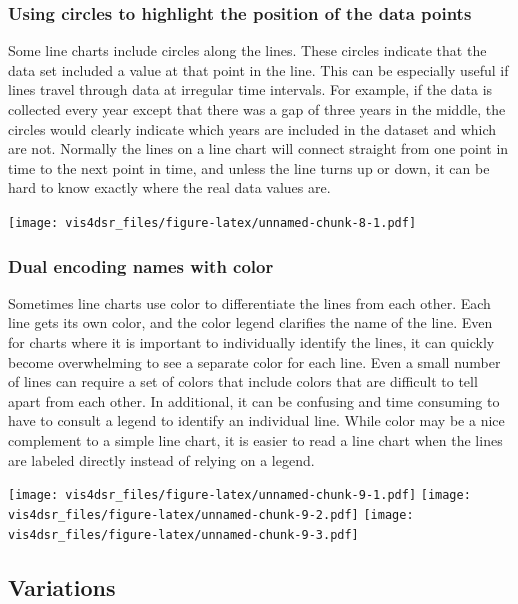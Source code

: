 \documentclass[
]{krantz}
\begin{document}
\hypertarget{using-circles-to-highlight-the-position-of-the-data-points}{%
\subsubsection{Using circles to highlight the position of the data points}\label{using-circles-to-highlight-the-position-of-the-data-points}}

Some line charts include circles along the lines. These circles indicate that the
data set included a value at that point in the line. This can be especially useful
if lines travel through data at irregular time intervals. For example, if the data
is collected every year except that there was a gap of three years in the middle,
the circles would clearly indicate which years are included in the dataset and which
are not. Normally the lines on a line chart will connect straight from one point in
time to the next point in time, and unless the line turns up or down, it can be
hard to know exactly where the real data values are.

\texttt{[image: vis4dsr\_files/figure-latex/unnamed-chunk-8-1.pdf]}

\hypertarget{dual-encoding-names-with-color}{%
\subsubsection{Dual encoding names with color}\label{dual-encoding-names-with-color}}

Sometimes line charts use color to differentiate the lines from each other. Each line
gets its own color, and the color legend clarifies the name of the line. Even for
charts where it is important to individually identify the lines, it can quickly
become overwhelming to see a separate color for each line. Even a small number of
lines can require a set of colors that include colors that are difficult to tell
apart from each other. In additional, it can be confusing and time consuming to have
to consult a legend to identify an individual line. While color may be a nice
complement to a simple line chart, it is easier to read a line chart when the lines
are labeled directly instead of relying on a legend.

\texttt{[image: vis4dsr\_files/figure-latex/unnamed-chunk-9-1.pdf]} \texttt{[image: vis4dsr\_files/figure-latex/unnamed-chunk-9-2.pdf]} \texttt{[image: vis4dsr\_files/figure-latex/unnamed-chunk-9-3.pdf]}

\hypertarget{variations-2}{%
\subsection{Variations}\label{variations-2}}
\end{document}
